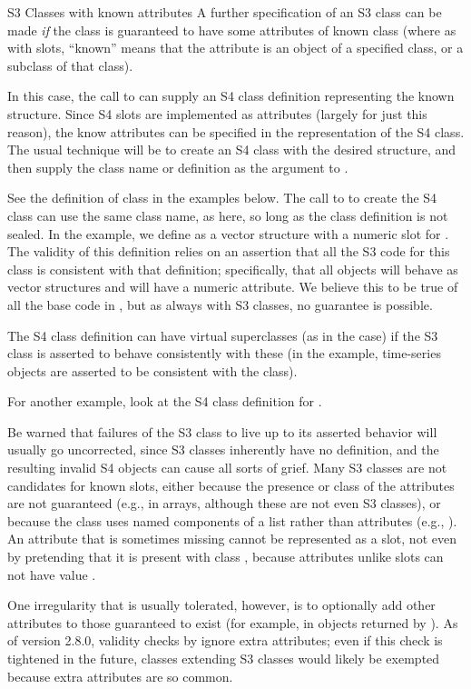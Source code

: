 \begin{Section}{S3 Classes with known attributes}
A further specification of an S3 class can be made \emph{if} the
class is guaranteed to have some attributes of known class (where as
with slots, ``known'' means that the attribute is an object of
a specified class, or a subclass of that class).

In this case, the call to  can supply an S4 class
definition representing the known structure.  Since S4 slots are
implemented as attributes (largely for just this reason), the know
attributes can be specified in the representation of the S4 class.
The usual technique will be to create an S4 class with the desired
structure, and then supply the class name or definition as the
argument  to . 

See the definition of class  in the examples below.  The
call to  to create the S4 class can use the same class name, as here,
so long as the class definition is not sealed.  In the example, we
define  as a vector structure with a numeric slot for
.  The validity of this definition relies on an
assertion that all the S3 code for this class is consistent with
that definition; specifically, that all  objects will
behave as vector structures and will have a numeric 
attribute. We  believe this to be true of all the base code in \R{},
but as always with S3 classes, no guarantee is possible.

The S4 class definition can  have virtual superclasses (as in
the  case) if the S3 class is asserted to behave
consistently with these (in the example, time-series objects are
asserted to be consistent with the  class).

For another example, look at the S4 class definition for .

Be warned that failures of the S3 class to live up to its asserted
behavior will usually go uncorrected, since S3 classes inherently
have no definition, and the resulting invalid S4 objects can cause
all sorts of grief.  Many S3 classes are not candidates for known
slots, either because the presence or class of the attributes are
not guaranteed  (e.g.,  in arrays, although these are
not even S3 classes), or because the class uses named components of
a list rather than attributes (e.g., ).  An attribute
that is sometimes missing cannot be represented as a slot, not even
by pretending that it is present with class , because
attributes unlike slots can not have value .

One irregularity that is usually tolerated, however, is to
optionally add other attributes to those guaranteed to exist (for
example,  in  objects returned by
).  As of version 2.8.0, validity checks by
 ignore extra attributes; even if this
check is tightened in the future, classes extending S3 classes
would likely be exempted because extra attributes are so common.

\end{Section}

